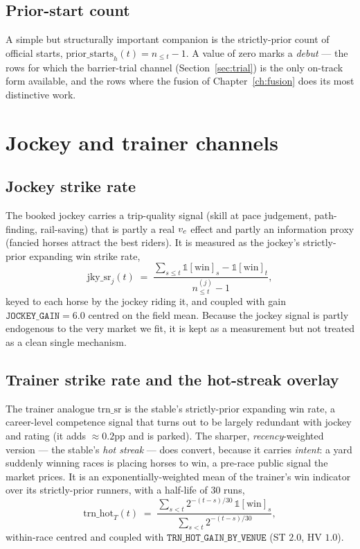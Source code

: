 \subsection{Prior-start count}

A simple but structurally important companion is the strictly-prior count of official starts,
$\text{prior\_starts}_h(t) = n_{\le t}-1$. A value of zero marks a \emph{debut} --- the rows for
which the barrier-trial channel (Section~\ref{sec:trial}) is the only on-track form available, and
the rows where the fusion of Chapter~\ref{ch:fusion} does its most distinctive work.

\section{Jockey and trainer channels}

\subsection{Jockey strike rate}

The booked jockey carries a trip-quality signal (skill at pace judgement, path-finding,
rail-saving) that is partly a real ${v_{c}}$ effect and partly an information proxy (fancied horses
attract the best riders). It is measured as the jockey's strictly-prior expanding win strike rate,
\begin{equation}
  \mathrm{jky\_sr}_j(t) \;=\;
   \frac{\sum_{s\le t}\mathbb{1}[\text{win}]_s - \mathbb{1}[\text{win}]_t}{n^{(j)}_{\le t}-1},
  \label{eq:jky}
\end{equation}
keyed to each horse by the jockey riding it, and coupled with gain
$\texttt{JOCKEY\_GAIN}=6.0$ centred on the field mean. Because the jockey signal is partly
endogenous to the very market we fit, it is kept as a measurement but not treated as a clean single
mechanism.

\subsection{Trainer strike rate and the hot-streak overlay}

The trainer analogue $\mathrm{trn\_sr}$ is the stable's strictly-prior expanding win rate, a
career-level competence signal that turns out to be largely redundant with jockey and rating (it
adds $\approx 0.2$pp and is parked). The sharper, \emph{recency}-weighted version --- the stable's
\emph{hot streak} --- does convert, because it carries \emph{intent}: a yard suddenly winning
races is placing horses to win, a pre-race public signal the market prices. It is an
exponentially-weighted mean of the trainer's win indicator over its strictly-prior runners, with a
half-life of $30$ runs,
\begin{equation}
  \mathrm{trn\_hot}_T(t) \;=\;
   \frac{\sum_{s<t} 2^{-(t-s)/30}\,\mathbb{1}[\text{win}]_s}{\sum_{s<t} 2^{-(t-s)/30}},
  \label{eq:trnhot}
\end{equation}
within-race centred and coupled with $\texttt{TRN\_HOT\_GAIN\_BY\_VENUE}$ (ST $2.0$, HV $1.0$).


